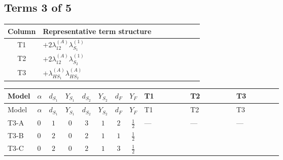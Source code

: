 \documentclass[8pt]{article}
\begin{document}
\begin{landscape}
\subsection*{Terms 3 of 5}
\begin{center}
\begin{tabular}{@{}c >{\raggedright\arraybackslash}p{0.82\linewidth}@{}}
\toprule
Column & Representative term structure \\
\midrule
T1 & \(\displaystyle +2 {\lambda_{12}^{(A)}} {\lambda_{S_1}^{(1)}}\) \\
\midrule
T2 & \(\displaystyle +2 {\lambda_{12}^{(A)}} {\lambda_{S_2}^{(1)}}\) \\
\midrule
T3 & \(\displaystyle +{\lambda_{HS_1}^{(A)}} {\lambda_{HS_2}^{(A)}}\) \\
\midrule
\bottomrule
\end{tabular}
\end{center}
\smallskip
\tiny
\begin{longtable}{@{}llcccccc >{\raggedright\arraybackslash}p{0.21\linewidth} >{\raggedright\arraybackslash}p{0.21\linewidth} >{\raggedright\arraybackslash}p{0.21\linewidth}@{}}
\toprule
Model & $\alpha$ & $d_{S_1}$ & $Y_{S_1}$ & $d_{S_2}$ & $Y_{S_2}$ & $d_F$ & $Y_F$ & T1 & T2 & T3 \\
\midrule
\endfirsthead
\toprule
Model & $\alpha$ & $d_{S_1}$ & $Y_{S_1}$ & $d_{S_2}$ & $Y_{S_2}$ & $d_F$ & $Y_F$ & T1 & T2 & T3 \\
\midrule
\endhead
T3-A & $0$ & $1$ & $0$ & $3$ & $1$ & $2$ & $\frac{1}{2}$ & --- & --- & --- \\
\midrule
T3-B & $0$ & $2$ & $0$ & $2$ & $1$ & $1$ & $\frac{1}{2}$ & \scriptsize\adjustbox{max width=\linewidth}{$\begin{gathered} +2 {\lambda_{12}^{(A)}} {\lambda_{S_1}^{(1)}}\end{gathered}$} & \scriptsize\adjustbox{max width=\linewidth}{$\begin{gathered} +2 {\lambda_{12}^{(A)}} {\lambda_{S_2}^{(1)}}\end{gathered}$} & \scriptsize\adjustbox{max width=\linewidth}{$\begin{gathered} +{\lambda_{HS_1}^{(A)}} {\lambda_{HS_2}^{(A)}}\end{gathered}$} \\
\midrule
T3-C & $0$ & $2$ & $0$ & $2$ & $1$ & $3$ & $\frac{1}{2}$ & \scriptsize\adjustbox{max width=\linewidth}{$\begin{gathered} +2 {\lambda_{12}^{(A)}} {\lambda_{S_1}^{(1)}}\end{gathered}$} & \scriptsize\adjustbox{max width=\linewidth}{$\begin{gathered} +2 {\lambda_{12}^{(A)}} {\lambda_{S_2}^{(1)}}\end{gathered}$} & \scriptsize\adjustbox{max width=\linewidth}{$\begin{gathered} +{\lambda_{HS_1}^{(A)}} {\lambda_{HS_2}^{(A)}}\end{gathered}$} \\

\end{longtable}
\end{landscape}
\end{document}
